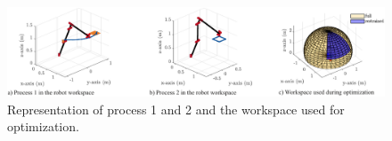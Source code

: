 %    
%    

\begin{figure}[tb]
  \vspace{-0.2cm}
  \centering
    \includegraphics{Chapters/Experiments/Experiment_Scenario/SzenarienKompakt.pdf}
  \vspace{-0.2cm}
  \caption{Representation of process 1 and 2 and the workspace used for optimization.}
  \label{fig:Process1}
  \vspace{-0.3cm}
\end{figure}